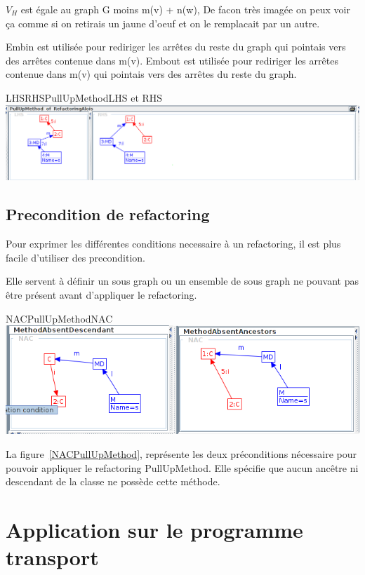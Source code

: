 \documentclass[a4paper, 12pt]{article}
\begin{document}
{$V_H$} est égale au graph G moins m(v) + n(w), De facon très imagée on peux voir ça comme si on retirais un jaune d'oeuf et on le remplacait par un autre.

Embin est utilisée pour rediriger les arrêtes du reste du graph qui pointais vers des arrêtes contenue dans m(v).
Embout est utilisée pour rediriger les arrêtes contenue dans m(v) qui pointais vers des arrêtes du reste du graph.


\begin{myfig}{LHSRHSPullUpMethod}{LHS et RHS}
\includegraphics[width=\textwidth]{LHSRHSPullUpMethod.png}
\end{myfig}

\subsection{Precondition de refactoring}
Pour exprimer les différentes conditions necessaire à un refactoring, il est plus facile d'utiliser des precondition.

Elle servent à définir un sous graph ou un ensemble de sous graph ne pouvant pas être présent avant d'appliquer le refactoring.


\begin{myfig}{NACPullUpMethod}{NAC}
\includegraphics[width=\textwidth]{NACPullUpMethod.png}
\end{myfig}

La figure~\ref{NACPullUpMethod}, représente les deux préconditions nécessaire pour pouvoir appliquer le refactoring PullUpMethod.
Elle spécifie que aucun ancêtre ni descendant de la classe ne possède cette méthode.


\section{Application sur le programme transport}
\end{document}
